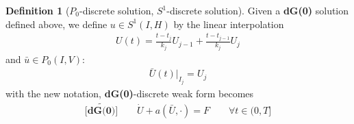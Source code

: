 \documentclass[a4paper,12pt,oneside,fleqn]{book}
\theoremstyle{definition}
\newtheorem{definition}{Definition}[section]
\theoremstyle{remark}
\begin{document}
 
\begin{definition}[$P_0$-discrete solution, $S^1$-discrete solution]
	Given a \textbf{dG(0)} solution defined above, we define $u \in S^1(I, H)$ by the linear interpolation
	\begin{align*}
		U(t) = \frac{t - t_j}{k_j}U_{j -1} + \frac{t - t_{j -1}}{k_j}U_j
	\end{align*}
	and $\bar{u} \in P_0(I, V)$:
	\begin{align*}
		\bar{U}(t)|_{I_j} = U_j
	\end{align*}
	with the new notation, \textbf{dG(0)}-discrete weak form becomes
	\begin{align*}
		\tilde{\textbf{[dG(0)]}}\qquad
		\dot{U} + a(\bar{U}, \cdot) = F \qquad \forall t \in (0, T]
	\end{align*}
\end{definition}
\end{document}

